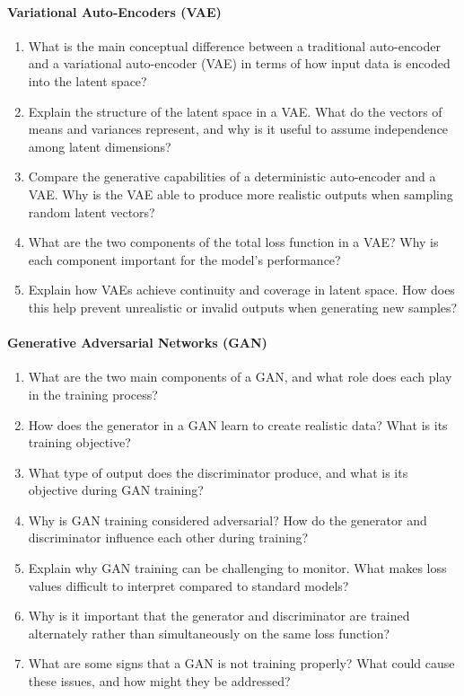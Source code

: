 \paragraph*{Variational Auto-Encoders (VAE)}
\begin{enumerate}
   \item What is the main conceptual difference between a traditional auto-encoder and a variational auto-encoder (VAE) in terms of how input data is encoded into the latent space?

   \item Explain the structure of the latent space in a VAE. What do the vectors of means and variances represent, and why is it useful to assume independence among latent dimensions?

   \item Compare the generative capabilities of a deterministic auto-encoder and a VAE. Why is the VAE able to produce more realistic outputs when sampling random latent vectors?

   \item What are the two components of the total loss function in a VAE? Why is each component important for the model's performance?

   \item Explain how VAEs achieve continuity and coverage in latent space. How does this help prevent unrealistic or invalid outputs when generating new samples?
\end{enumerate}

\paragraph*{Generative Adversarial Networks (GAN)}

\begin{enumerate}
   \item What are the two main components of a GAN, and what role does each play in the training process?

   \item How does the generator in a GAN learn to create realistic data? What is its training objective?

   \item What type of output does the discriminator produce, and what is its objective during GAN training?

   \item Why is GAN training considered adversarial? How do the generator and discriminator influence each other during training?

   \item Explain why GAN training can be challenging to monitor. What makes loss values difficult to interpret compared to standard models?

   \item Why is it important that the generator and discriminator are trained alternately rather than simultaneously on the same loss function?

   \item What are some signs that a GAN is not training properly? What could cause these issues, and how might they be addressed?
\end{enumerate}
